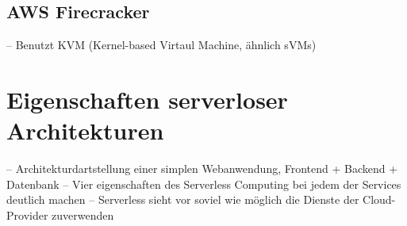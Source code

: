 \subsection{AWS Firecracker}
-- Benutzt KVM (Kernel-based Virtaul Machine, ähnlich sVMs)\\

\section{Eigenschaften serverloser Architekturen}
-- Architekturdartstellung einer simplen Webanwendung, Frontend + Backend + Datenbank
-- Vier eigenschaften des Serverless Computing bei jedem der Services deutlich machen
-- Serverless sieht vor soviel wie möglich die Dienste der Cloud-Provider zuverwenden